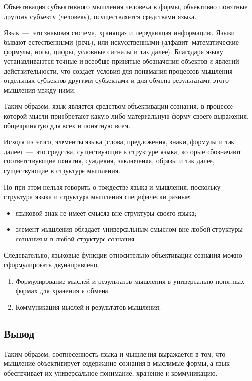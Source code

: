 \documentclass[14pt]{extarticle}
\begin{document}
Объективация субъективного мышления человека в формы, объективно понятные другому субъекту (человеку), осуществляется средствами языка.

Язык~---~это знаковая система, хранящая и передающая информацию. Языки бывают естественными (речь), или искусственными (алфавит, математические формулы, ноты, цифры, условные сигналы и так далее). Благодаря языку устанавливаются точные и всеобще принятые обозначения объектов и явлений действительности, что создает условия для понимания процессов мышления отдельных субъектов другими субъектами и для обмена результатами этого мышления между ними.

Таким образом, язык является средством объективации сознания, в процессе которой мысли приобретают какую-либо материальную форму своего выражения, общепринятую для всех и понятную всем.

Исходя из этого, элементы языка (слова, предложения, знаки, формулы и так далее)~---~это средства, существующие в структуре языка, которые обозначают соответствующие понятия, суждения, заключения, образы и так далее, существующие в структуре мышления.

Но при этом нельзя говорить о тождестве языка и мышления, поскольку структура языка и структура мышления специфически разные:

\begin{itemize}
	\item языковой знак не имеет смысла вне структуры своего языка;
	\item элемент мышления обладает универсальным смыслом вне любой структуры сознания и в любой структуре сознания.
\end{itemize}

Следовательно, языковые функции относительно объективации сознания можно сформулировать двунаправлено.

\begin{enumerate}
	\item Формулирование мыслей и результатов мышления в универсально понятных формах для хранения и обмена.
	\item Коммуникация мыслей и результатов мышления.
\end{enumerate}

\subsection*{Вывод}

Таким образом, соотнесенность языка и мышления выражается в том, что мышление объективирует содержание сознания в мыслимые формы, а язык обеспечивает их универсальное понимание, хранение и коммуникацию.
\end{document}
